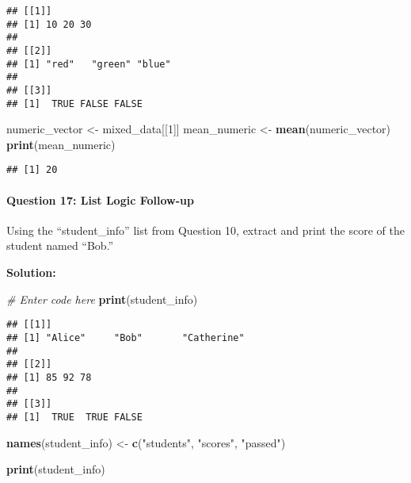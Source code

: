 \documentclass[
]{article}
\newenvironment{Shaded}{\begin{snugshade}}{\end{snugshade}}
\newcommand{\CommentTok}[1]{\textcolor[rgb]{0.56,0.35,0.01}{\textit{#1}}}
\newcommand{\DecValTok}[1]{\textcolor[rgb]{0.00,0.00,0.81}{#1}}
\newcommand{\FunctionTok}[1]{\textcolor[rgb]{0.13,0.29,0.53}{\textbf{#1}}}
\newcommand{\NormalTok}[1]{#1}
\newcommand{\OtherTok}[1]{\textcolor[rgb]{0.56,0.35,0.01}{#1}}
\newcommand{\StringTok}[1]{\textcolor[rgb]{0.31,0.60,0.02}{#1}}
\begin{document}
\begin{verbatim}
## [[1]]
## [1] 10 20 30
## 
## [[2]]
## [1] "red"   "green" "blue" 
## 
## [[3]]
## [1]  TRUE FALSE FALSE
\end{verbatim}

\begin{Shaded}
\begin{Highlighting}[]
\NormalTok{numeric\_vector }\OtherTok{\textless{}{-}}\NormalTok{ mixed\_data[[}\DecValTok{1}\NormalTok{]]}
\NormalTok{mean\_numeric }\OtherTok{\textless{}{-}} \FunctionTok{mean}\NormalTok{(numeric\_vector)}
\FunctionTok{print}\NormalTok{(mean\_numeric)}
\end{Highlighting}
\end{Shaded}

\begin{verbatim}
## [1] 20
\end{verbatim}

\hypertarget{question-17-list-logic-follow-up}{%
\paragraph{Question 17: List Logic
Follow-up}\label{question-17-list-logic-follow-up}}

Using the ``student\_info'' list from Question 10, extract and print the
score of the student named ``Bob.''

\textbf{Solution:}

\begin{Shaded}
\begin{Highlighting}[]
\CommentTok{\# Enter code here}
\FunctionTok{print}\NormalTok{(student\_info)}
\end{Highlighting}
\end{Shaded}

\begin{verbatim}
## [[1]]
## [1] "Alice"     "Bob"       "Catherine"
## 
## [[2]]
## [1] 85 92 78
## 
## [[3]]
## [1]  TRUE  TRUE FALSE
\end{verbatim}

\begin{Shaded}
\begin{Highlighting}[]
\FunctionTok{names}\NormalTok{(student\_info) }\OtherTok{\textless{}{-}} \FunctionTok{c}\NormalTok{(}\StringTok{"students"}\NormalTok{, }\StringTok{"scores"}\NormalTok{, }\StringTok{"passed"}\NormalTok{)}

\FunctionTok{print}\NormalTok{(student\_info)}
\end{Highlighting}
\end{Shaded}
\end{document}
